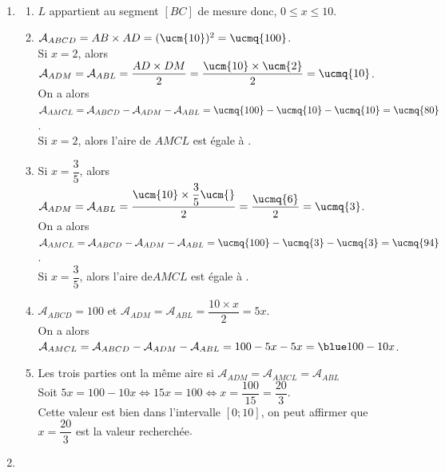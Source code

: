 {\begin{corrige}
\ \\ [-5mm]
   \begin{enumerate}
      \item 
         \begin{enumerate}
            \item $L$ appartient au segment $[BC]$ de mesure  donc, {\blue $0\leq x\leq10$}. \smallskip
           \item $\mathcal{A}_{ABCD} =AB\times AD =(\ucm{10})^2 =\ucmq{100}$. \\ [1mm]
              Si $x =2$, alors $\mathcal{A}_{ADM} =\mathcal{A}_{ABL} =\dfrac{AD\times DM}{2} =\dfrac{\ucm{10}\times\ucm{2}}{2} =\ucmq{10}$. \\ [1mm]
              On a alors $\mathcal{A}_{AMCL} =\mathcal{A}_{ABCD}-\mathcal{A}_{ADM}-\mathcal{A}_{ABL} =\ucmq{100}-\ucmq{10}-\ucmq{10} =\ucmq{80}$. \\ [1mm]
              {\blue Si $x =2$, alors l’aire de $AMCL$ est égale à }.
            \item Si $x =\dfrac35$, alors $\mathcal{A}_{ADM} =\mathcal{A}_{ABL} =\dfrac{\ucm{10}\times\dfrac35\ucm{}}{2} =\dfrac{\ucmq{6}}{2} =\ucmq{3}$. \\ [1mm]
              On a alors $\mathcal{A}_{AMCL} =\mathcal{A}_{ABCD}-\mathcal{A}_{ADM}-\mathcal{A}_{ABL} =\ucmq{100}-\ucmq{3}-\ucmq{3} =\ucmq{94}$. \\ [1mm]
              {\blue Si $x =\dfrac35$, alors l’aire de$AMCL$ est égale à }. \smallskip
            \item $\mathcal{A}_{ABCD} =100$ et $\mathcal{A}_{ADM} =\mathcal{A}_{ABL} =\dfrac{10\times x}{2} =5x$. \\ [1mm]
              On a alors $\mathcal{A}_{AMCL} =\mathcal{A}_{ABCD}-\mathcal{A}_{ADM}-\mathcal{A}_{ABL} =100-5x-5x ={\blue 100-10x}$.
            \item Les trois parties ont la même aire si $\mathcal{A}_{ADM} =\mathcal{A}_{AMCL} =\mathcal{A}_{ABL}$ \\ [1mm]
               Soit $5x =100-10x \iff 15x =100 \iff x =\dfrac{100}{15} =\dfrac{20}{3}$. \\ [1mm]
               Cette valeur est bien dans l'intervalle $[0;10]$, on peut affirmer que {\blue $x =\dfrac{20}{3}$ est la valeur recherchée}.
         \end{enumerate}
      \setcounter{enumi}{1}
      \item 
         \begin{enumerate}

\end{enumerate}
\end{enumerate}
\end{corrige}}
